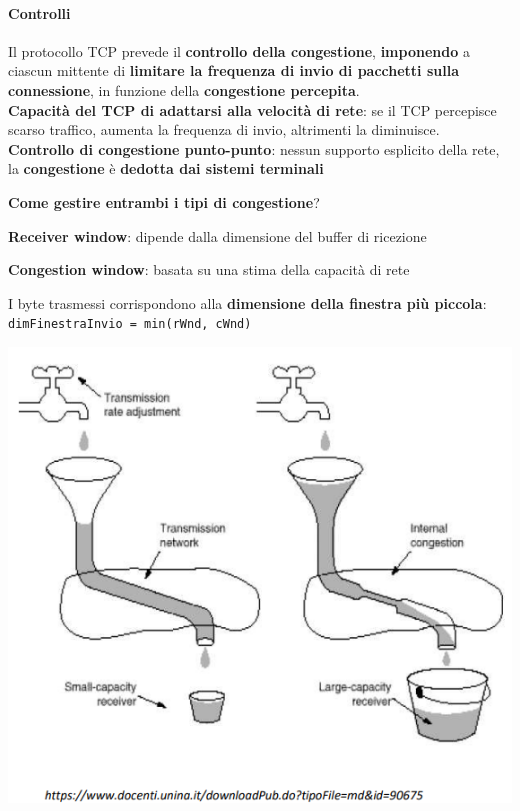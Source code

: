\documentclass[10pt]{article}
\begin{document}
\paragraph{Controlli} Il protocollo TCP prevede il \textbf{controllo della congestione}, \textbf{imponendo} a ciascun mittente di \textbf{limitare la frequenza di invio di pacchetti sulla connessione}, in funzione della \textbf{congestione percepita}.\\
\textbf{Capacità del TCP di adattarsi alla velocità di rete}: se il TCP percepisce scarso traffico, aumenta la frequenza di invio, altrimenti la diminuisce.\\
\textbf{Controllo di congestione punto-punto}: nessun supporto esplicito della rete, la \textbf{congestione} è \textbf{dedotta dai sistemi terminali}
\pagebreak
\begin{multicols}{2}
\textbf{Come gestire entrambi i tipi di congestione}?
\begin{list}{}{}
\item \textbf{Receiver window}: dipende dalla dimensione del buffer di ricezione
\item \textbf{Congestion window}: basata su una stima della capacità di rete
\end{list}
I byte trasmessi corrispondono alla \textbf{dimensione della finestra più piccola}:\\
\texttt{dimFinestraInvio = min(rWnd, cWnd)}

\columnbreak
\includegraphics[scale=0.6]{congestionetipi.png}
\end{multicols}
\end{document}
